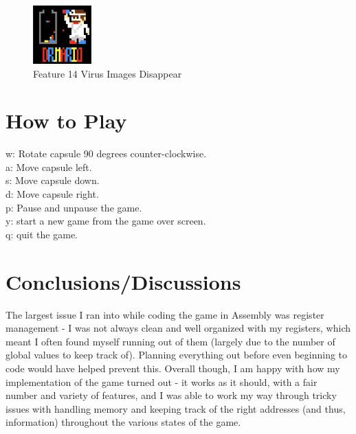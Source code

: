 \documentclass{article}
\begin{document}
\begin{figure}[ht!]
    \centering
    \includegraphics[width=0.2\textwidth]{viruses_gone.png}
    \caption{Feature 14 Virus Images Disappear}
    \label{Instructions}
\end{figure}

\section{How to Play}
w: Rotate capsule 90 degrees counter-clockwise.\\
a: Move capsule left.\\
s: Move capsule down.\\
d: Move capsule right.\\
p: Pause and unpause the game.\\
y: start a new game from the game over screen.\\
q: quit the game.\\

\section{Conclusions/Discussions}
The largest issue I ran into while coding the game in Assembly was register management - I was not always clean and well organized with my registers, which meant I often found myself running out of them (largely due to the number of global values to keep track of). Planning everything out before even beginning to code would have helped prevent this. Overall though, I am happy with how my implementation of the game turned out - it works as it should, with a fair number and variety of features, and I was able to work my way through tricky issues with handling memory and keeping track of the right addresses (and thus, information) throughout the various states of the game.
\end{document}
